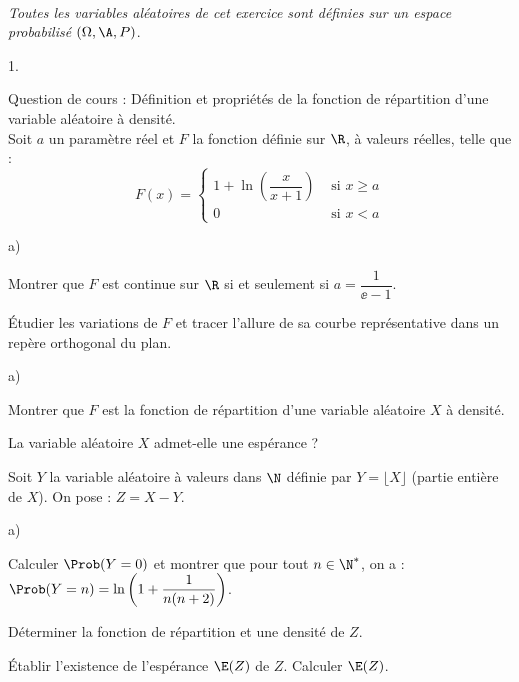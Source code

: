 \documentclass[11pt]{article}%
\begin{document}
\newpage


\begin{exerciceAP}~\\
  {\it Toutes les variables aléatoires de cet exercice sont définies
    sur un espace probabilisé $(\Omega,\A,P)$}.
  \begin{noliste}{1.}
    \setlength{\itemsep}{2mm}
  \item Question de cours : Définition et propriétés de la fonction de
    répartition d'une variable aléatoire à densité.\\
    Soit $a$ un paramètre réel et $F$ la fonction définie sur $\R$, à
    valeurs réelles, telle que :
    \[
    F(x)=\left\{
      \begin{array}{cl}
        1+\ln\left(\dfrac{x}{x+1}\right) & \mbox{ si $x\geq a$}\\
        0 & \mbox{ si $x<a$}
      \end{array}
    \right.
    \]
  \item 
    \begin{noliste}{a)}
    \setlength{\itemsep}{2mm}
    \item Montrer que $F$ est continue sur $\R$ si et seulement si
      $a=\dfrac{1}{\ee -1}$.

    \item Étudier les variations de $F$ et tracer l'allure de sa
      courbe représentative dans un repère orthogonal du plan.
    \end{noliste}

  \item
    \begin{noliste}{a)}
    \setlength{\itemsep}{2mm}
    \item Montrer que $F$ est la fonction de répartition d'une
      variable aléatoire $X$ à densité.
    \item La variable aléatoire $X$ admet-elle une espérance ?
    \end{noliste}

  \item Soit $Y$ la variable aléatoire à valeurs dans $\N$ définie par
    $Y=\lfloor X\rfloor$ (partie entière de $X$). On pose : $Z=X-Y$.
    \begin{noliste}{a)}
    \setlength{\itemsep}{2mm}
    \item Calculer $\Prob(Y=0)$ et montrer que pour tout $n\in\N^*$, on a
      : $\Prob(Y=n)=\ln\left(1+\dfrac{1}{n(n+2)}\right)$.
    \item Déterminer la fonction de répartition et une densité de $Z$.
    \item Établir l'existence de l'espérance $\E(Z)$ de $Z$. Calculer
      $\E(Z)$.
    \end{noliste}
  \end{noliste}
\end{exerciceAP}
\end{document}
